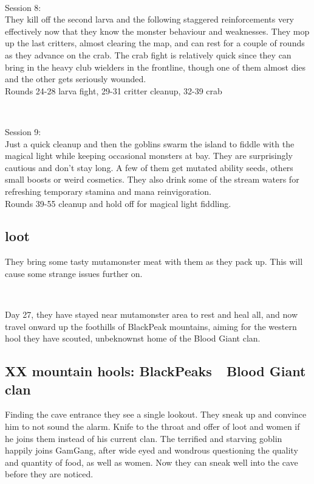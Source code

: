 \

Session 8:\\                                                            %
They kill off the second larva and the following staggered reinforcements very effectively now that they know the monster behaviour and weaknesses. They mop up the last critters, almost clearing the map, and can rest for a couple of rounds as they advance on the crab. The crab fight is relatively quick since they can bring in the heavy club wielders in the frontline, though one of them almost dies and the other gets seriously wounded.\\
Rounds 24-28 larva fight, 29-31 critter cleanup, 32-39 crab

\

Session 9:\\                                                            %
Just a quick cleanup and then the goblins swarm the island to fiddle with the magical light while keeping occasional monsters at bay. They are surprisingly cautious and don't stay long. A few of them get mutated ability seeds, others small boosts or weird cosmetics. They also drink some of the stream waters for refreshing temporary stamina and mana reinvigoration.\\
Rounds 39-55 cleanup and hold off for magical light fiddling.


\subsection*{loot}

They bring some tasty mutamonster meat with them as they pack up. This will cause some strange issues further on.

\

Day 27, they have stayed near mutamonster area to rest and heal all, and now travel onward up the foothills of BlackPeak mountains, aiming for the western hool they have scouted, unbeknownst home of the Blood Giant clan.


\subsection*{XX mountain hools: BlackPeaks~\mdash~Blood Giant clan}

Finding the cave entrance they see a single lookout. They sneak up and convince him to not sound the alarm. Knife to the throat and offer of loot and women if he joins them instead of his current clan. The terrified and starving goblin happily joins GamGang, after wide eyed and wondrous questioning the quality and quantity of food, as well as women. Now they can sneak well into the cave before they are noticed.

